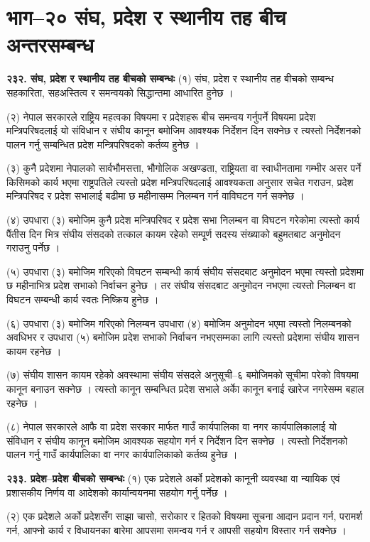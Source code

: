 \section{भाग–२० संघ, प्रदेश र स्थानीय तह बीच अन्तरसम्बन्ध}

\textbf{२३२. संघ, प्रदेश र स्थानीय तह बीचको सम्बन्धः} (१) संघ, प्रदेश र स्थानीय तह बीचको सम्बन्ध सहकारिता, सहअस्तित्व र समन्वयको सिद्धान्तमा आधारित हुनेछ ।

(२) नेपाल सरकारले राष्ट्रिय महत्वका विषयमा र प्रदेशहरू बीच समन्वय गर्नुपर्ने विषयमा प्रदेश मन्त्रिपरिषदलाई यो संविधान र संघीय कानून बमोजिम आवश्यक निर्देशन दिन सक्नेछ र त्यस्तो निर्देशनको पालन गर्नु सम्बन्धित प्रदेश मन्त्रिपरिषदको कर्तव्य हुनेछ ।

(३) कुनै प्रदेशमा नेपालको सार्वभौमसत्ता, भौगोलिक अखण्डता, राष्ट्रियता वा स्वाधीनतामा गम्भीर असर पर्ने किसिमको कार्य भएमा
राष्ट्रपतिले त्यस्तो प्रदेश मन्त्रिपरिषदलाई आवश्यकता अनुसार सचेत गराउन, प्रदेश मन्त्रिपरिषद र प्रदेश सभालाई बढीमा छ महीनासम्म निलम्बन गर्न वाविघटन गर्न सक्नेछ ।

(४) उपधारा (३) बमोजिम कुनै प्रदेश मन्त्रिपरिषद र प्रदेश सभा निलम्बन वा विघटन गरेकोमा त्यस्तो कार्य पैंतीस दिन भित्र संघीय संसदको
तत्काल कायम रहेको सम्पूर्ण सदस्य संख्याको बहुमतबाट अनुमोदन गराउनु पर्नेछ ।

(५) उपधारा (३) बमोजिम गरिएको विघटन सम्बन्धी कार्य संघीय संसदबाट अनुमोदन भएमा त्यस्तो प्रदेशमा छ महीनाभित्र प्रदेश सभाको
निर्वाचन हुनेछ ।
तर संघीय संसदबाट अनुमोदन नभएमा त्यस्तो निलम्बन वा विघटन सम्बन्धी कार्य स्वतः निष्क्रिय हुनेछ ।

(६) उपधारा (३) बमोजिम गरिएको निलम्बन उपधारा (४) बमोजिम अनुमोदन भएमा त्यस्तो निलम्बनको अवधिभर र उपधारा (५) बमोजिम प्रदेश सभाको निर्वाचन नभएसम्मका लागि त्यस्तो प्रदेशमा संघीय शासन कायम रहनेछ ।

(७) संघीय शासन कायम रहेको अवस्थामा संघीय संसदले अनुसूची–६ बमोजिमको सूचीमा परेको विषयमा कानून बनाउन सक्नेछ । त्यस्तो कानून सम्बन्धित प्रदेश सभाले अर्काे कानून बनाई खारेज नगरेसम्म बहाल रहनेछ ।

(८) नेपाल सरकारले आफै वा प्रदेश सरकार मार्फत गाउँ कार्यपालिका वा नगर कार्यपालिकालाई यो संविधान र संघीय कानून बमोजिम आवश्यक सहयोग गर्न र निर्देशन दिन सक्नेछ । त्यस्तो निर्देशनको पालन गर्नु गाउँ कार्यपालिका वा नगर कार्यपालिकाको कर्तव्य हुनेछ ।

\textbf{२३३. प्रदेश–प्रदेश बीचको सम्बन्धः} (१) एक प्रदेशले अर्को प्रदेशको कानूनी व्यवस्था वा न्यायिक एवं प्रशासकीय निर्णय वा आदेशको कार्यान्वयनमा सहयोग गर्नु पर्नेछ ।

(२) एक प्रदेशले अर्को प्रदेशसँग साझा चासो, सरोकार र हितको विषयमा सूचना आदान प्रदान गर्न, परामर्श गर्न, आफ्नो कार्य र विधायनका
बारेमा आपसमा समन्वय गर्न र आपसी सहयोग विस्तार गर्न सक्नेछ ।

